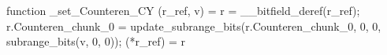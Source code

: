 function _set_Counteren_CY (r_ref, v) = {
    r = __bitfield_deref(r_ref);
    r.Counteren_chunk_0 = update_subrange_bits(r.Counteren_chunk_0, 0, 0, subrange_bits(v, 0, 0));
    (*r_ref) = r
}

